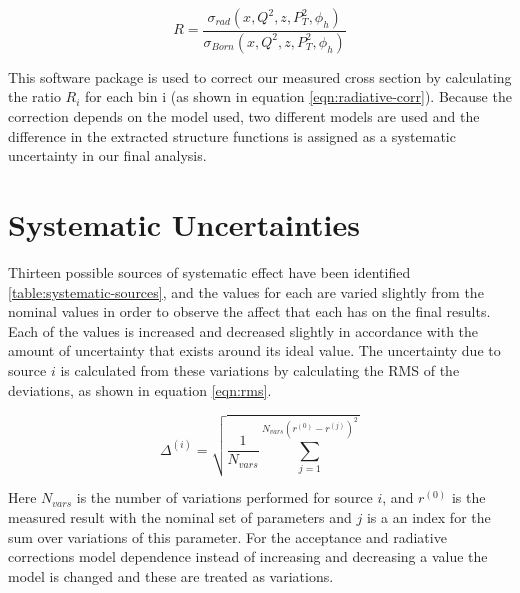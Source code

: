 \begin{equation}
	\label{eqn:radiative-corr}
	R = \frac{\sigma_{rad} (x, Q^2, z, P_T^2, \phi_h)}{\sigma_{Born} (x, Q^2, z, P_T^2, \phi_h)}
\end{equation}

This software package is used to correct our measured cross section by calculating the ratio $R_{i}$ for each bin i (as shown in equation \ref{eqn:radiative-corr}).  Because the correction depends on the model used, two different models are used and the difference in the extracted structure functions is assigned as a systematic uncertainty in our final analysis.
 
\section{Systematic Uncertainties}
Thirteen possible sources of systematic effect have been identified \ref{table:systematic-sources}, and the values for each are varied slightly from the nominal values in order to observe the affect that each has on the final results.  Each of the values is increased and decreased slightly in accordance with the amount of uncertainty that exists around its ideal value.  The uncertainty due to source $i$ is calculated from these variations by calculating the RMS of the deviations, as shown in equation \ref{eqn:rms}.

\begin{equation}
	\label{eqn:rms}
	\Delta^{(i)} = \sqrt{\frac{1}{N_{vars}} \sum_{j = 1}^{N_{vars} (r^{(0)} - r^{(j)})^2}}
\end{equation}

Here $N_{vars}$ is the number of variations performed for source $i$, and $r^{(0)}$ is the measured result with the nominal set of parameters and $j$ is a an index for the sum over variations of this parameter.  For the acceptance and radiative corrections model dependence instead of increasing and decreasing a value the model is changed and these are treated as variations.  \\

